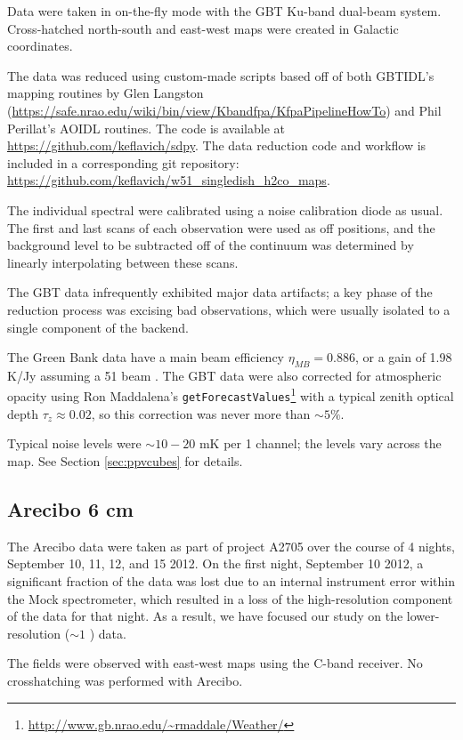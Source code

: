 Data were taken in on-the-fly mode with the GBT Ku-band dual-beam system.
Cross-hatched north-south and east-west maps were created in Galactic
coordinates. 

The data was reduced using custom-made scripts based off of both GBTIDL's
mapping routines by Glen Langston
(\url{https://safe.nrao.edu/wiki/bin/view/Kbandfpa/KfpaPipelineHowTo}) and Phil
Perillat's AOIDL routines.  The code is available at
\url{https://github.com/keflavich/sdpy}.  The data reduction code and workflow
is included in a corresponding git repository:
\url{https://github.com/keflavich/w51_singledish_h2co_maps}.

The individual spectral were calibrated using a noise calibration diode as
usual.  The first and last scans of each observation were used as off
positions, and the background level to be subtracted off of the continuum was
determined by linearly interpolating between these scans.

The GBT data infrequently exhibited major data artifacts; a key phase of the
reduction process was excising bad observations, which were usually isolated to
a single component of the backend.

The Green Bank data have a main beam efficiency $\eta_{MB} = 0.886$, or a gain
of 1.98 K/Jy assuming a 51 \arcsec beam \citep[see][for additional
discussion]{Mangum2013a}.  The GBT data were also corrected for atmospheric
opacity using Ron Maddalena's
\texttt{getForecastValues}\footnote{\url{http://www.gb.nrao.edu/~rmaddale/Weather/}}
with a typical zenith optical depth $\tau_{z}\approx0.02$, so this
correction was never more than $\sim5\%$.

Typical noise levels were $\sim10-20$ mK per 1 \kms channel; the levels vary
across the map.  See Section \ref{sec:ppvcubes} for details.

\subsection{Arecibo 6 cm}
The Arecibo data were taken as part of project A2705 over the course of 4
nights, September 10, 11, 12, and 15 2012.  On the first night, September 10
2012, a significant fraction of the data was lost due to an internal instrument
error within the Mock spectrometer, which resulted in a loss of the
high-resolution component of the \formaldehyde data for that night.  As a
result, we have focused our study on the lower-resolution ($\sim1$ \kms) data.

The fields were observed with east-west maps using the C-band receiver.  No
crosshatching was performed with Arecibo.

